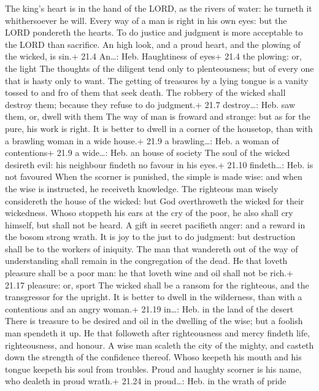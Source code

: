  The king's heart is in the hand of the LORD, as the rivers
of water: he turneth it whithersoever he will.  Every way of
a man is right in his own eyes: but the LORD pondereth the hearts.
 To do justice and judgment is more acceptable to the LORD
than sacrifice.  An high look, and a proud heart, and the
plowing of the wicked, is sin.+ 21.4 An\ldots: Heb. Haughtiness of eyes+
21.4 the plowing: or, the light  The thoughts of the
diligent tend only to plenteousness; but of every one that is hasty only
to want.  The getting of treasures by a lying tongue is a
vanity tossed to and fro of them that seek death.  The
robbery of the wicked shall destroy them; because they refuse to do
judgment.+ 21.7 destroy\ldots: Heb. saw them, or, dwell with them
 The way of man is froward and strange: but as for the pure,
his work is right.  It is better to dwell in a corner of the
housetop, than with a brawling woman in a wide house.+ 21.9 a
brawling\ldots: Heb. a woman of contentions+ 21.9 a wide\ldots: Heb. an
house of society  The soul of the wicked desireth evil: his
neighbour findeth no favour in his eyes.+ 21.10 findeth\ldots: Heb. is
not favoured  When the scorner is punished, the simple is
made wise: and when the wise is instructed, he receiveth knowledge.
 The righteous man wisely considereth the house of the
wicked: but God overthroweth the wicked for their wickedness.
 Whoso stoppeth his ears at the cry of the poor, he also
shall cry himself, but shall not be heard.  A gift in
secret pacifieth anger: and a reward in the bosom strong wrath.
 It is joy to the just to do judgment: but destruction
shall be to the workers of iniquity.  The man that
wandereth out of the way of understanding shall remain in the
congregation of the dead.  He that loveth pleasure shall be
a poor man: he that loveth wine and oil shall not be rich.+ 21.17
pleasure: or, sport  The wicked shall be a ransom for the
righteous, and the transgressor for the upright.  It is
better to dwell in the wilderness, than with a contentious and an angry
woman.+ 21.19 in\ldots: Heb. in the land of the desert 
There is treasure to be desired and oil in the dwelling of the wise; but
a foolish man spendeth it up.  He that followeth after
righteousness and mercy findeth life, righteousness, and honour.
 A wise man scaleth the city of the mighty, and casteth
down the strength of the confidence thereof.  Whoso keepeth
his mouth and his tongue keepeth his soul from troubles. 
Proud and haughty scorner is his name, who dealeth in proud wrath.+
21.24 in proud\ldots: Heb. in the wrath of pride

